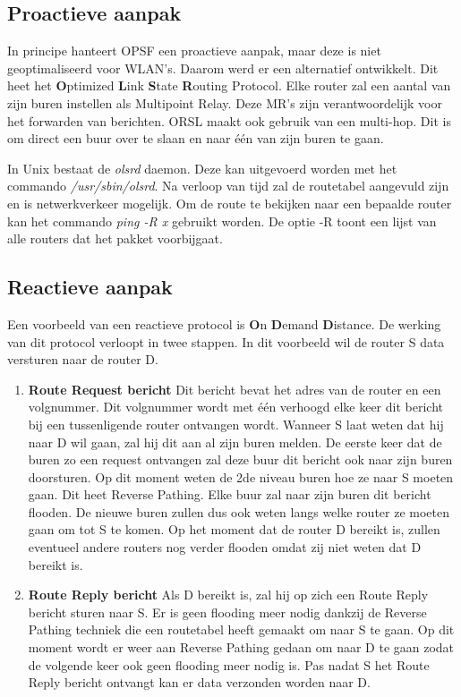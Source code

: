 \documentclass{report}
\begin{document}
\subsection{Proactieve aanpak}
In principe hanteert OPSF een proactieve aanpak, maar deze is niet geoptimaliseerd voor WLAN's. Daarom werd er een alternatief ontwikkelt. Dit heet het \textbf{O}ptimized \textbf{L}ink \textbf{S}tate \textbf{R}outing Protocol. Elke router zal een aantal van zijn buren instellen als Multipoint Relay. Deze MR's zijn verantwoordelijk voor het forwarden van berichten. ORSL maakt ook gebruik van een multi-hop. Dit is om direct een buur over te slaan en naar één van zijn buren te gaan.

In Unix bestaat de \textit{olsrd} daemon. Deze kan uitgevoerd worden met het commando \textit{/usr/sbin/olsrd}. Na verloop van tijd zal de routetabel aangevuld zijn en is netwerkverkeer mogelijk. Om de route te bekijken naar een bepaalde router kan het commando \textit{ping -R x} gebruikt worden. De optie -R toont een lijst van alle routers dat het pakket voorbijgaat.
\subsection{Reactieve aanpak}
Een voorbeeld van een reactieve protocol is \textbf{O}n \textbf{D}emand \textbf{D}istance. De werking van dit protocol verloopt in twee stappen. In dit voorbeeld wil de router S data versturen naar de router D.
\begin{enumerate}
	\item \textbf{Route Request bericht}
	\newline
	Dit bericht bevat het adres van de router en een volgnummer. Dit volgnummer wordt met één verhoogd elke keer dit bericht bij een tussenligende router ontvangen wordt. Wanneer S laat weten dat hij naar D wil gaan, zal hij dit aan al zijn buren melden. De eerste keer dat de buren zo een request ontvangen zal deze buur dit bericht ook naar zijn buren doorsturen. Op dit moment weten de 2de niveau buren hoe ze naar S moeten gaan. Dit heet Reverse Pathing. Elke buur zal naar zijn buren dit bericht flooden. De nieuwe buren zullen dus ook weten langs welke router ze moeten gaan om tot S te komen. Op het moment dat de router D bereikt is, zullen eventueel andere routers nog verder flooden omdat zij niet weten dat D bereikt is. 
	\item \textbf{Route Reply bericht}
	\newline
	Als D bereikt is, zal hij op zich een Route Reply bericht sturen naar S. Er is geen flooding meer nodig dankzij de Reverse Pathing techniek die een routetabel heeft gemaakt om naar S te gaan. Op dit moment wordt er weer aan Reverse Pathing gedaan om naar D te gaan zodat de volgende keer ook geen flooding meer nodig is. Pas nadat S het Route Reply bericht ontvangt kan er data verzonden worden naar D.
\end{enumerate}
\end{document}

